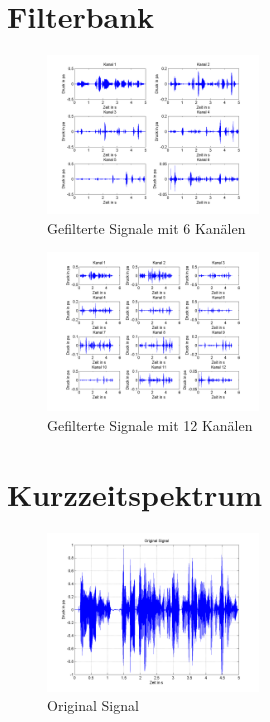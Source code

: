 \documentclass[conference]{IEEEtran}
\begin{document}
\section{Filterbank}

\begin{figure}[h]
	\centering
	\includegraphics[width=0.5\textwidth]{img/fb_6.png}
	\caption{Gefilterte Signale mit 6 Kanälen}
	\label{fig:fb-6}
\end{figure}

\begin{figure}[h]
	\centering
	\includegraphics[width=0.5\textwidth]{img/fb_12.png}
	\caption{Gefilterte Signale mit 12 Kanälen}
	\label{fig:fb-12}
\end{figure}

\section{Kurzzeitspektrum}

\begin{figure}[h]
	\centering
	\includegraphics[width=0.5\textwidth]{img/sig_orig.png}
	\caption{Original Signal}
	\label{fig:sig-orig}
\end{figure}
\end{document}
